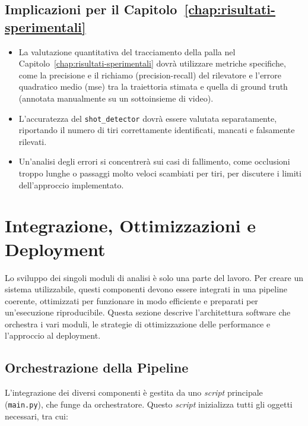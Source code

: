 \documentclass[12pt,a4paper,openright,twoside]{book}
\begin{document}
\subsection*{Implicazioni per il Capitolo~\ref{chap:risultati-sperimentali}}

\begin{itemize}
  \item La valutazione quantitativa del tracciamento della palla nel Capitolo~\ref{chap:risultati-sperimentali} dovrà utilizzare 
  metriche specifiche, come la precisione e il richiamo (precision-recall) del rilevatore e l'errore quadratico medio 
  (\ac{mse}) tra la traiettoria stimata e quella di ground truth (annotata manualmente su un sottoinsieme di video).
  \item L'accuratezza del \texttt{shot\_detector} dovrà essere valutata separatamente, riportando il numero di tiri correttamente 
  identificati, mancati e falsamente rilevati.
  \item Un'analisi degli errori si concentrerà sui casi di fallimento, come occlusioni troppo lunghe o passaggi molto veloci 
  scambiati per tiri, per discutere i limiti dell'approccio implementato.
\end{itemize}

\section{Integrazione, Ottimizzazioni e Deployment}
\label{sec:integrazione-ottimizzazioni}

Lo sviluppo dei singoli moduli di analisi è solo una parte del lavoro. Per creare un sistema utilizzabile, questi componenti devono essere integrati
in una pipeline coerente, ottimizzati per funzionare in modo efficiente e preparati per un'esecuzione riproducibile. Questa sezione descrive 
l'architettura software che orchestra i vari moduli, le strategie di ottimizzazione delle performance e l'approccio al deployment.

\subsection{Orchestrazione della Pipeline}
\label{subsec:orchestrazione-pipeline}

L'integrazione dei diversi componenti è gestita da uno \emph{script} principale (\texttt{main.py}), che funge da orchestratore. 
Questo \emph{script} inizializza tutti gli oggetti necessari, tra cui:
\end{document}
